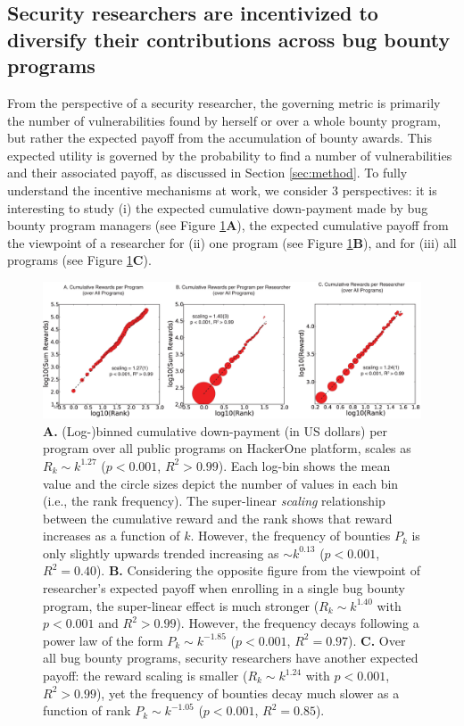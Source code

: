 \subsection{Security researchers are incentivized to diversify their contributions across bug bounty programs}
From the perspective of a security researcher, the governing metric is primarily the number of vulnerabilities found by herself or over a whole bounty program, but rather the expected payoff from the accumulation of bounty awards. This expected utility is governed by the probability to find a number of vulnerabilities and their associated payoff, as discussed in Section \ref{sec:method}. To fully understand the incentive mechanisms at work, we consider 3 perspectives: it is interesting to study (i) the expected cumulative down-payment made by bug bounty program managers (see Figure \ref{fig:scalings_awards}{\bf A}), the expected cumulative payoff from the viewpoint of a researcher for (ii) one program (see Figure \ref{fig:scalings_awards}{\bf B}), and for (iii) all programs (see Figure \ref{fig:scalings_awards}{\bf C}).\\


\begin{figure}[Ht]
\begin{center}
\includegraphics[width=12cm]{figures/scalings_awards.eps}
\caption{{\bf A.} (Log-)binned cumulative down-payment (in US dollars) per program over all public programs on HackerOne platform, scales as $R_{k} \sim k^{1.27}$ ($ p < 0.001$, $R^2 > 0.99$). Each log-bin shows the mean value and the circle sizes depict the number of values in each bin (i.e., the rank frequency). The super-linear {\it scaling} relationship between the cumulative reward and the rank shows that reward increases as a function of $k$. However, the frequency of bounties $P_k$ is only slightly upwards trended increasing as $ \sim k^{0.13}$ ($ p < 0.001$, $R^2 = 0.40$). {\bf B.} Considering the opposite figure from the viewpoint of researcher's expected payoff when enrolling in a single bug bounty program, the super-linear effect is much stronger ($R_{k} \sim k^{1.40}$ with $ p < 0.001$ and $R^2 > 0.99$). However, the frequency decays following a power law of the form $P_{k} \sim k^{-1.85}$ ($ p < 0.001$, $R^2 = 0.97$). {\bf C.} Over all bug bounty programs, security researchers have another expected payoff: the reward scaling is smaller ($R_{k} \sim k^{1.24}$ with $ p < 0.001$, $R^2 > 0.99$), yet the frequency of bounties decay much slower as a function of rank $P_{k} \sim k^{-1.05}$ ($ p < 0.001$, $R^2 = 0.85$).}
\label{fig:scalings_awards}
\end{center}
\end{figure}

